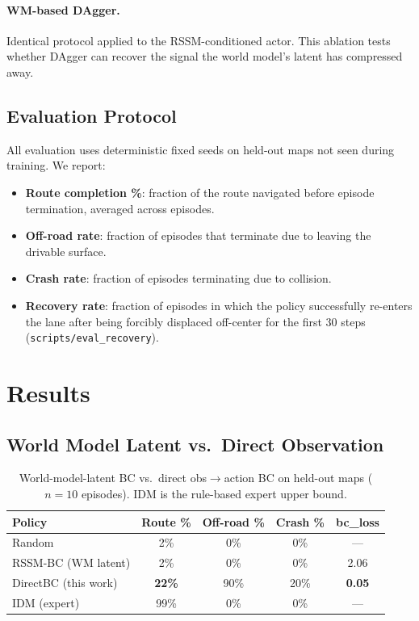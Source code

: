 \documentclass{article}
\begin{document}
\paragraph{WM-based DAgger.}
Identical protocol applied to the RSSM-conditioned actor. This ablation
tests whether DAgger can recover the signal the world model's latent has
compressed away.

\subsection{Evaluation Protocol}

All evaluation uses deterministic fixed seeds on held-out maps not seen
during training. We report:
\begin{itemize}
  \item \textbf{Route completion \%}: fraction of the route navigated before
    episode termination, averaged across episodes.
  \item \textbf{Off-road rate}: fraction of episodes that terminate due to
    leaving the drivable surface.
  \item \textbf{Crash rate}: fraction of episodes terminating due to
    collision.
  \item \textbf{Recovery rate}: fraction of episodes in which the policy
    successfully re-enters the lane after being forcibly displaced
    off-center for the first 30 steps (\texttt{scripts/eval\_recovery}).
\end{itemize}

\section{Results}
\label{sec:results}

\subsection{World Model Latent vs.\ Direct Observation}

\begin{table}[t]
\centering
\caption{
  World-model-latent BC vs.\ direct obs$\to$action BC on held-out maps
  ($n{=}10$ episodes). IDM is the rule-based expert upper bound.
}
\label{tab:ablation}
\small
\begin{tabular}{lcccc}
\toprule
Policy & Route \% & Off-road \% & Crash \% & bc\_loss \\
\midrule
Random                & 2\%  & 0\%  & 0\%  & --- \\
RSSM-BC (WM latent)   & 2\%  & 0\%  & 0\%  & 2.06 \\
DirectBC (this work)  & \textbf{22\%} & 90\% & 20\% & \textbf{0.05} \\
IDM (expert)          & 99\% & 0\%  & 0\%  & --- \\
\bottomrule
\end{tabular}
\end{table}
\end{document}
